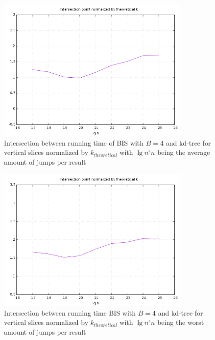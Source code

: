 \begin{figure}[h]
    \centering
    \includegraphics[width = 0.85\textwidth]{pictures/analysis/fours/vert_avg.png}
    \caption{Intersection between running time of BIS with $B=4$ and kd-tree for vertical slices normalized by $k_{theoretical}$ with $\lg n^\epsilon n$ being the average amount of jumps per result}\label{fig:b4_vert_theory}
\end{figure}

\begin{figure}[h]
    \centering
    \includegraphics[width = 0.85\textwidth]{pictures/analysis/fours/vert_worst.png}
    \caption{Intersection between running time BIS with $B=4$ and kd-tree for vertical slices normalized by $k_{theoretical}$ with $\lg n^\epsilon n$ being the worst amount of jumps per result}\label{fig:b4_vert_theory_worst}
\end{figure}


